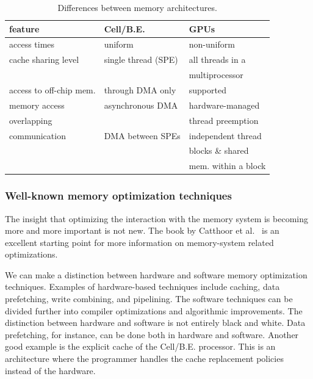 \documentclass{article}
\begin{document}
\begin{table}[t]
\begin{center}
{\footnotesize
\begin{tabular}{|l|l|l|}
\hline
feature                   & Cell/B.E.                      & GPUs \\
\hline
access times              & uniform                        & non-uniform \\
\hline
cache sharing level       & single thread (SPE)            & all threads in a \\
                          &                                & multiprocessor \\
\hline
access to off-chip mem.   & through DMA only               & supported \\
\hline
memory access             & asynchronous DMA               & hardware-managed \\
overlapping               &                                & thread preemption \\
\hline
communication             & DMA between SPEs               & independent thread  \\
                          &                                & blocks \& shared   \\
                          &                                & mem. within a block \\
\hline
\end{tabular}
} %
\end{center}
\vspace{-0.5cm}
\caption{Differences between memory architectures.}
\label{memory-properties}
\end{table}



\subsubsection{Well-known memory optimization techniques}

The insight that optimizing the interaction with the memory system is
becoming more and more important is not new.  The book by Catthoor et
al.~\cite{data-access} is an excellent starting point for more
information on memory-system related optimizations. 

We can make a distinction between hardware and software memory
optimization techniques.  Examples of hardware-based techniques include caching, data
prefetching, write combining, and pipelining. The software techniques can be divided
further into compiler optimizations and algorithmic improvements.
  The distinction between hardware and
software is not entirely black and white. Data prefetching, for
instance, can be done both in hardware and software.  Another good
example is the explicit cache of the \mbox{Cell/B.E.} processor. This is
an architecture where the programmer handles the cache
replacement policies instead of the hardware.
\end{document}
